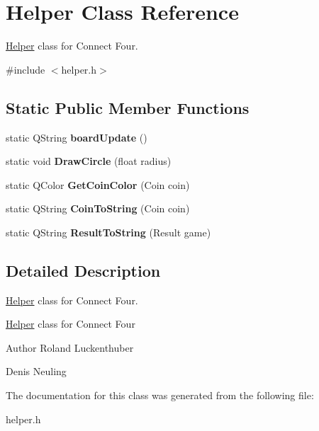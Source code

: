 \hypertarget{classHelper}{\section{\-Helper \-Class \-Reference}
\label{classHelper}
}


\hyperlink{classHelper}{\-Helper} class for \-Connect \-Four.  




{\ttfamily \#include $<$helper.\-h$>$}

\subsection*{\-Static \-Public \-Member \-Functions}
\begin{DoxyCompactItemize}
\item 
\hypertarget{classHelper_a13ac9ee4039795a9b27bc38a81b9f870}{static \-Q\-String {\bfseries board\-Update} ()}\label{classHelper_a13ac9ee4039795a9b27bc38a81b9f870}

\item 
\hypertarget{classHelper_ae7ae04b5ed393589228994c9ce203cac}{static void {\bfseries \-Draw\-Circle} (float radius)}\label{classHelper_ae7ae04b5ed393589228994c9ce203cac}

\item 
\hypertarget{classHelper_a41d44186f3a08524419153f19aa9b5f2}{static \-Q\-Color {\bfseries \-Get\-Coin\-Color} (\-Coin coin)}\label{classHelper_a41d44186f3a08524419153f19aa9b5f2}

\item 
\hypertarget{classHelper_aeb6829bbdecf8901d143d6a364082919}{static \-Q\-String {\bfseries \-Coin\-To\-String} (\-Coin coin)}\label{classHelper_aeb6829bbdecf8901d143d6a364082919}

\item 
\hypertarget{classHelper_a665cf4e080d1e25199e5545df0cc253c}{static \-Q\-String {\bfseries \-Result\-To\-String} (\-Result game)}\label{classHelper_a665cf4e080d1e25199e5545df0cc253c}

\end{DoxyCompactItemize}


\subsection{\-Detailed \-Description}
\hyperlink{classHelper}{\-Helper} class for \-Connect \-Four. 

\hyperlink{classHelper}{\-Helper} class for \-Connect \-Four

\begin{DoxyAuthor}{\-Author}
\-Roland \-Luckenthuber 

\-Denis \-Neuling 
\end{DoxyAuthor}


\-The documentation for this class was generated from the following file\-:\begin{DoxyCompactItemize}
\item 
helper.\-h\end{DoxyCompactItemize}

